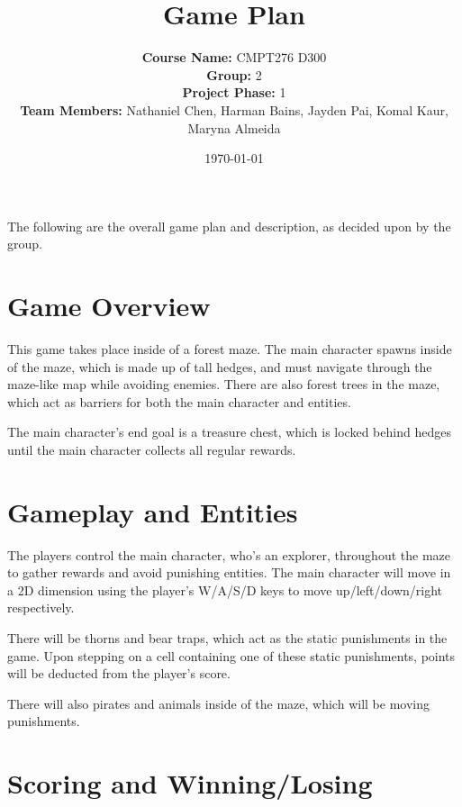 \documentclass[10pt,letterpaper]{article}
\title{Game Plan}
\date{\today}
\begin{document}
\maketitle

\author{
\begin{center}
\textbf{Course Name:}   CMPT276 D300 \\
\textbf{Group:}         2 \\
\textbf{Project Phase:} 1 \\ 
\textbf{Team Members:}  Nathaniel Chen, Harman Bains, Jayden Pai, Komal Kaur, Maryna Almeida
\end{center}
}

% 
The following are the overall game plan and description, as decided upon by the group.

\section{Game Overview}

This game takes place inside of a forest maze. The main character spawns inside of the maze, which is made up of tall hedges, and must
navigate through the maze-like map while avoiding enemies. There are also forest trees in the maze, which act as barriers for both the main
character and entities.

The main character's end goal is a treasure chest, which is locked behind hedges until the main character collects all regular rewards.

\section{Gameplay and Entities}

The players control the main character, who's an explorer, throughout the maze to gather rewards and avoid punishing entities. The main
character will move in a 2D dimension using the player's W/A/S/D keys to move up/left/down/right respectively.

There will be thorns and bear traps, which act as the static punishments in the game. Upon stepping on a cell containing one of these
static punishments, points will be deducted from the player's score.

There will also pirates and animals inside of the maze, which will be moving punishments.

\section{Scoring and Winning/Losing}
\end{document}
